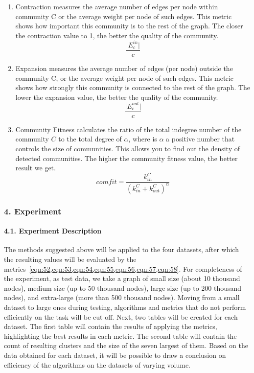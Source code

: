 \begin{enumerate}
	\item Contraction \cite{ChenNguyenSzymanski} measures the average number of edges per node within community C or the average weight per node of such edges. This metric shows how important this community is to the rest of the graph. The closer the contraction value to 1, the better the quality of the community. \begin{equation}
		\label{eqn:56}
		\frac{\lvert E_c^{in} \rvert}{c}
	\end{equation}

	\item Expansion \cite{ChenNguyenSzymanski} measures the average number of edges (per node) outside the community C, or the average weight per node of such edges. This metric shows how strongly this community is connected to the rest of the graph. The lower the expansion value, the better the quality of the community.\begin{equation}
		\label{eqn:57}
		\frac{\lvert E_c^{out} \rvert}{c}
	\end{equation}

	\item Community Fitness \cite{KaurSinghKaushal} calculates the ratio of the total indegree number of the community \(C\) to the total degree of \(\alpha\), where is \(\alpha\) a positive number that controls the size of communities. This allows you to find out the density of detected communities. The higher the community fitness value, the better result we get. \begin{equation}
		\label{eqn:58}
		\textit{comfit} = \frac{k_{in}^C}{(k_{in}^C + k_{out}^C)^\alpha}
	\end{equation}
\end{enumerate}

\subsubsection{4. Experiment}

\paragraph{4.1. Experiment Description} The methods suggested above will be applied to the four datasets, after which the resulting values will be evaluated by the metrics~\cref{eqn:52,eqn:53,eqn:54,eqn:55,eqn:56,eqn:57,eqn:58}. For completeness of the experiment, as test data, we take a graph of small size (about 10 thousand nodes), medium size (up to 50 thousand nodes), large size (up to 200 thousand nodes), and extra-large (more than 500 thousand nodes). Moving from a small dataset to large ones during testing, algorithms and metrics that do not perform efficiently on the task will be cut off. Next, two tables will be created for each dataset. The first table will contain the results of applying the metrics, highlighting the best results in each metric. The second table will contain the count of resulting clusters and the size of the seven largest of them. Based on the data obtained for each dataset, it will be possible to draw a conclusion on efficiency of the algorithms on the datasets of varying volume.

